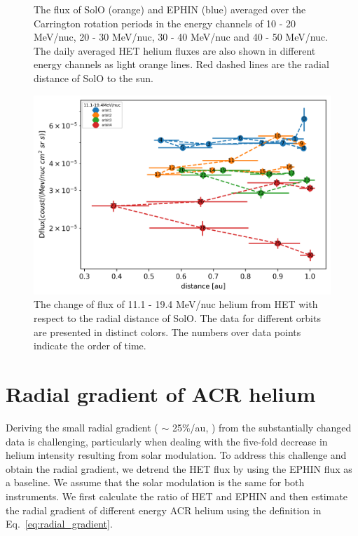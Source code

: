 \begin{figure}
    \caption[The averaged helium flux in four energy channels between 10 and 50 MeV/nuc]{The flux of \ac{SolO} (orange) and \ac{EPHIN} (blue) averaged over the Carrington rotation periods in the energy channels of 10 - 20 MeV/nuc, 20 - 30 MeV/nuc, 30 - 40 MeV/nuc and 40 - 50 MeV/nuc. The daily averaged \ac{HET} helium fluxes are also shown in different energy channels as light orange lines. Red dashed lines are the radial distance of \ac{SolO} to the sun.}
    \label{fig:carrington_flux}
\end{figure}

\begin{figure}
    \centering
    \includegraphics[scale = 0.8]{images/ACR/SOLO-flux_only.png}
    \caption[11.1 - 19.4 MeV/nuc \ac{HET} helium flux vs the radial distance of \ac{SolO}]{The change of flux of 11.1 - 19.4 MeV/nuc helium from \ac{HET} with respect to the radial distance of \ac{SolO}. The data for different orbits are presented in distinct colors. The numbers over data points indicate the order of time. }
    \label{fig:fluxvsdistance}  
\end{figure}


\section{Radial gradient of ACR helium}

Deriving the small radial gradient ( $\sim$ 25\%/au, \citet{Rankin2021ApJ}) from the substantially changed data is challenging, particularly when dealing with the five-fold decrease in helium intensity resulting from solar modulation.
To address this challenge and obtain the radial gradient, we detrend the \ac{HET} flux by using the \ac{EPHIN} flux as a baseline. We assume that the solar modulation is the same for both instruments. We first calculate the ratio of \ac{HET} and \ac{EPHIN} and then estimate the radial gradient of different energy \ac{ACR} helium using the definition in Eq.~\ref{eq:radial_gradient}.

